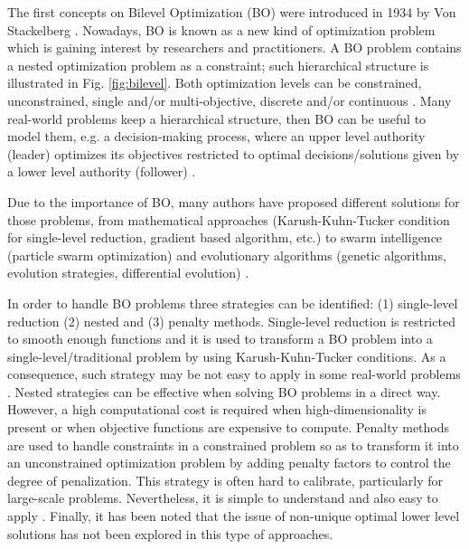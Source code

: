 \documentclass[conference]{IEEEtran}
\theoremstyle{definition}
\begin{document}
The first concepts on Bilevel Optimization (BO) were introduced in 1934 by Von
Stackelberg \cite{von2010market}. Nowadays, BO is known as a new kind of optimization
problem which is gaining interest by researchers and practitioners. A BO problem
contains a nested optimization problem as a constraint; such hierarchical structure
is illustrated in Fig. \ref{fig:bilevel}. Both optimization levels can be constrained,
unconstrained, single and/or multi-objective, discrete and/or continuous
\cite{bard2013practical,dempe2002foundations}. Many real-world problems keep a hierarchical
structure, then BO can be useful to model them, e.g. a decision-making process,
where an upper level authority (leader) optimizes its objectives restricted to
optimal decisions/solutions given by a  lower level authority (follower)
\cite{brotcorne2001bilevel,kalashnikov2010comparison,sinha2015transportation,von1945theory,wang2014bilevel}.

Due to the importance of BO, many authors have proposed different solutions
for those problems, from mathematical approaches (Karush-Kuhn-Tucker condition for
single-level reduction, gradient based algorithm, etc.) \cite{dempe2002foundations,shi2005extended}
to swarm intelligence (particle swarm optimization) and evolutionary algorithms
(genetic algorithms, evolution strategies, differential evolution)
\cite{derrac2011practical,angelo2013differential,li2006hierarchical}.

In order to handle BO problems three strategies can be identified: (1) single-level
reduction (2) nested and (3) penalty methods. Single-level reduction is restricted
to smooth enough functions and it is used to transform a BO problem into a single-level/traditional
problem by using Karush-Kuhn-Tucker conditions. As a consequence, such strategy
may be not easy to apply in some real-world problems  \cite{dempe2002foundations,colson2007overview}. %
Nested strategies can be effective when solving BO problems in a direct way. However, 
a high computational cost is required when high-dimensionality is present or when
objective functions are expensive to compute. Penalty methods are used to handle
constraints in a constrained problem so as to transform it into an unconstrained
optimization problem by adding penalty factors to control the degree of penalization.
This strategy is often hard to calibrate, particularly for large-scale problems.
Nevertheless, it is simple to understand and also easy to apply \cite{savard1994steepest,white1993penalty}.
Finally, it has been noted that the issue of non-unique optimal lower level
solutions has not been explored in this type of approaches.
\end{document}
